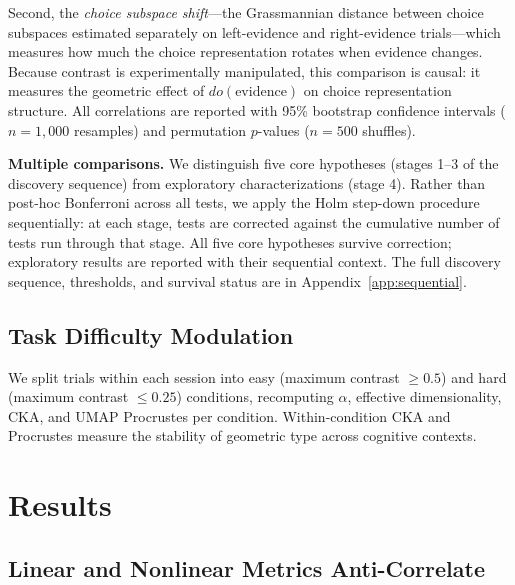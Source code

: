 \documentclass{article}
\begin{document}
Second, the \emph{choice subspace shift}---the Grassmannian distance between choice subspaces estimated separately on left-evidence and right-evidence trials---which measures how much the choice representation rotates when evidence changes. Because contrast is experimentally manipulated, this comparison is causal: it measures the geometric effect of $do(\text{evidence})$ on choice representation structure. All correlations are reported with 95\% bootstrap confidence intervals ($n = 1{,}000$ resamples) and permutation $p$-values ($n = 500$ shuffles).

\textbf{Multiple comparisons.} We distinguish five core hypotheses (stages 1--3 of the discovery sequence) from exploratory characterizations (stage 4). Rather than post-hoc Bonferroni across all tests, we apply the Holm step-down procedure sequentially: at each stage, tests are corrected against the cumulative number of tests run through that stage. All five core hypotheses survive correction; exploratory results are reported with their sequential context. The full discovery sequence, thresholds, and survival status are in Appendix~\ref{app:sequential}.

\subsection{Task Difficulty Modulation}

We split trials within each session into easy (maximum contrast $\geq 0.5$) and hard (maximum contrast $\leq 0.25$) conditions, recomputing $\alpha$, effective dimensionality, CKA, and UMAP Procrustes per condition. Within-condition CKA and Procrustes measure the stability of geometric type across cognitive contexts.

\section{Results}

\subsection{Linear and Nonlinear Metrics Anti-Correlate}
\end{document}
